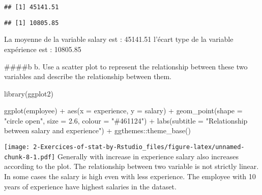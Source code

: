 \documentclass[
]{article}
\newenvironment{Shaded}{\begin{snugshade}}{\end{snugshade}}
\newcommand{\AttributeTok}[1]{\textcolor[rgb]{0.77,0.63,0.00}{#1}}
\newcommand{\FloatTok}[1]{\textcolor[rgb]{0.00,0.00,0.81}{#1}}
\newcommand{\FunctionTok}[1]{\textcolor[rgb]{0.00,0.00,0.00}{#1}}
\newcommand{\NormalTok}[1]{#1}
\newcommand{\SpecialCharTok}[1]{\textcolor[rgb]{0.00,0.00,0.00}{#1}}
\newcommand{\StringTok}[1]{\textcolor[rgb]{0.31,0.60,0.02}{#1}}
\begin{document}
\begin{Shaded}
\end{Shaded}

\begin{verbatim}
## [1] 45141.51
\end{verbatim}

\begin{Shaded}
\end{Shaded}

\begin{verbatim}
## [1] 10805.85
\end{verbatim}

La moyenne de la variable salary est : 45141.51 l'écart type de la
variable expérience est : 10805.85

\#\#\#\#b b. Use a scatter plot to represent the relationship between
these two variables and describe the relationship between them.

\begin{Shaded}
\begin{Highlighting}[]
\FunctionTok{library}\NormalTok{(ggplot2)}

\FunctionTok{ggplot}\NormalTok{(employee) }\SpecialCharTok{+}
 \FunctionTok{aes}\NormalTok{(}\AttributeTok{x =}\NormalTok{ experience, }\AttributeTok{y =}\NormalTok{ salary) }\SpecialCharTok{+}
 \FunctionTok{geom\_point}\NormalTok{(}\AttributeTok{shape =} \StringTok{"circle open"}\NormalTok{, }\AttributeTok{size =} \FloatTok{2.6}\NormalTok{, }\AttributeTok{colour =} \StringTok{"\#461124"}\NormalTok{) }\SpecialCharTok{+}
 \FunctionTok{labs}\NormalTok{(}\AttributeTok{subtitle =} \StringTok{"Relationship between salary and experience"}\NormalTok{) }\SpecialCharTok{+}
\NormalTok{ ggthemes}\SpecialCharTok{::}\FunctionTok{theme\_base}\NormalTok{()}
\end{Highlighting}
\end{Shaded}

\texttt{[image: 2-Exercices-of-stat-by-Rstudio\_files/figure-latex/unnamed-chunk-8-1.pdf]}
Generally with increase in experience salary also increases according to
the plot. The relationship between two variable is not strictly linear.
In some cases the salary is high even with less experience. The employee
with 10 years of experience have highest salaries in the dataset.
\end{document}
